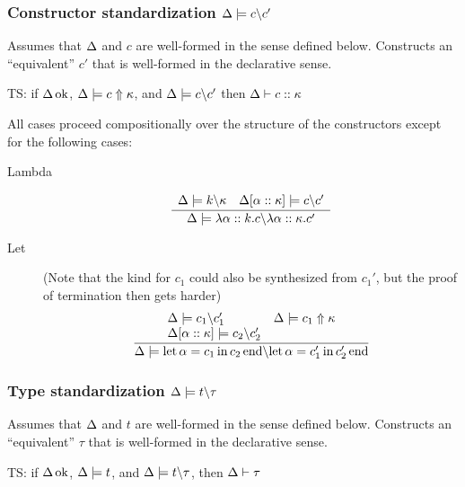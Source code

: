 \documentclass[12pt,twoside,fleqn]{amsart}
\theoremstyle{plain}
\theoremstyle{plain}
\theoremstyle{definition}
\begin{document}
\subsubsection{Constructor standardization \protect\( \Delta  \models c \backslash c'\protect \)}

Assumes that \( \Delta  \) and \( c \) are well-formed in the sense defined
below. Constructs an ``equivalent'' \( c' \) that is well-formed in the declarative
sense.

TS: if \( \Delta  \, \mathrm{ok} \), \( \Delta  \models c \Uparrow \kappa  \),
and \( \Delta  \models c \backslash c' \) then \( \Delta  \vdash c ::\kappa  \)

All cases proceed compositionally over the structure of the constructors except
for the following cases:

\begin{description}
\item [Lambda]
\[
\frac{\begin{array}{ll}
\Delta  \models k \backslash \kappa  & \Delta  [\alpha   ::\kappa   ] \models c \backslash c'
\end{array} }{\Delta  \models \lambda \alpha  ::k .c \backslash \lambda \alpha  ::\kappa  .c' }\]

\item [Let](Note that the kind for \( c_{1} \) could also be synthesized from \( c_{1}' \),
but the proof of termination then gets harder)
\[
\frac{\begin{array}{ll}
\Delta  \models c_{1} \backslash c_{1}' & \Delta  \models c_{1} \Uparrow \kappa \\
\Delta  [\alpha   ::\kappa   ] \models c_{2} \backslash c_{2}' & 
\end{array} }{\Delta  \models \mathrm{let}\, \alpha  =c_{1} \, \mathrm{in}\, c_{2} \, \mathrm{end} \backslash \mathrm{let}\, \alpha  =c_{1}' \, \mathrm{in}\, c_{2}' \, \mathrm{end} }\]

\end{description}

\subsubsection{Type standardization \protect\( \Delta  \models t \backslash \tau \protect \)}

Assumes that \( \Delta  \) and \( t \) are well-formed in the sense defined
below. Constructs an ``equivalent'' \( \tau  \) that is well-formed in the
declarative sense.

TS: if \( \Delta  \, \mathrm{ok} \), \( \Delta  \models t \), and \( \Delta  \models t \backslash \tau  \),
then \( \Delta  \vdash \tau  \)
\end{document}
